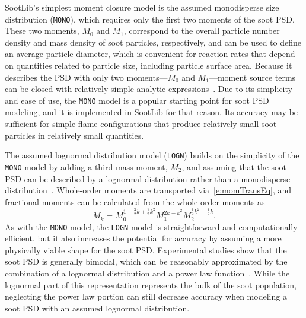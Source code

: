 \documentclass[preprint,letterpaper]{elsarticle}
\begin{document}
SootLib's simplest moment closure model is the assumed monodisperse size distribution (\texttt{MONO}), which requires only the first two moments of the soot PSD. These two moments, $M_0$ and $M_1$, correspond to the overall particle number density and mass density of soot particles, respectively, and can be used to define an average particle diameter, which is convenient for reaction rates that depend on quantities related to particle size, including particle surface area. Because it describes the PSD with only two moments---$M_0$ and $M_1$---moment source terms can be closed with relatively simple analytic expressions~\cite{Lignell_2008b}. Due to its simplicity and ease of use, the \texttt{MONO} model is a popular starting point for soot PSD modeling, and it is implemented in SootLib for that reason. Its accuracy may be sufficient for simple flame configurations that produce relatively small soot particles in relatively small quantities.

The assumed lognormal distribution model (\texttt{LOGN}) builds on the simplicity of the \texttt{MONO} model by adding a third mass moment, $M_2$, and assuming that the soot PSD can be described by a lognormal distribution rather than a monodisperse distribution~\cite{Lignell_2008b}. Whole-order moments are transported via~\eqref{e:momTransEq}, and fractional moments can be calculated from the whole-order moments as
\begin{equation}
    M_k = M_0^{1-\frac{3}{2}k+\frac{1}{2}k^2} M_1^{2k-k^2} M_2^{\frac{1}{2}k^2-\frac{1}{2}k}.
\end{equation}
As with the \texttt{MONO} model, the \texttt{LOGN} model is straightforward and computationally efficient, but it also increases the potential for accuracy by assuming a more physically viable shape for the soot PSD. Experimental studies show that the soot PSD is generally bimodal, which can be reasonably approximated by the combination of a lognormal distribution and a power law function~\cite{Zhao_2003,Zhao_2003b,Wang_2009,Wang_2011,Gu_2016}. While the lognormal part of this representation represents the bulk of the soot population, neglecting the power law portion can still decrease accuracy when modeling a soot PSD with an assumed lognormal distribution.
\end{document}
